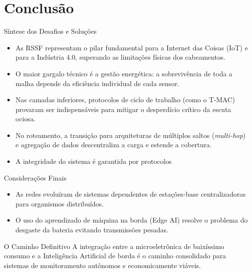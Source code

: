 \section{Conclusão}

\begin{frame}{Síntese dos Desafios e Soluções}
    \begin{itemize}
        \item As RSSF representam o pilar fundamental para a Internet das Coisas (IoT) e para a Indústria 4.0, superando as limitações físicas dos cabeamentos.  
        \item O maior gargalo técnico é a gestão energética: a sobrevivência de toda a malha depende da eficiência individual de cada sensor.  
        \item Nas camadas inferiores, protocolos de ciclo de trabalho (como o T-MAC) provaram ser indispensáveis para mitigar o desperdício crítico da escuta ociosa.  
        \item No roteamento, a transição para arquiteturas de múltiplos saltos (\textit{multi-hop}) e agregação de dados descentraliza a carga e estende a cobertura.
        \item A integridade do sistema é garantida por protocolos  
    \end{itemize}
\end{frame}

\begin{frame}{Considerações Finais}
    \begin{itemize}
        \item As redes evoluíram de sistemas dependentes de estações-base centralizadoras para organismos distribuídos.  
        \item O uso do aprendizado de máquina na borda (Edge AI) resolve o problema do desgaste da bateria evitando transmissões pesadas.  
    \end{itemize}

    \vspace{0.5cm}

    \begin{block}{O Caminho Definitivo}
        A integração entre a microeletrônica de baixíssimo consumo e a Inteligência Artificial de borda é o caminho consolidado para sistemas de monitoramento autônomos e economicamente viáveis.  
    \end{block}
    
    \vspace{0.5cm}
    

\end{frame}